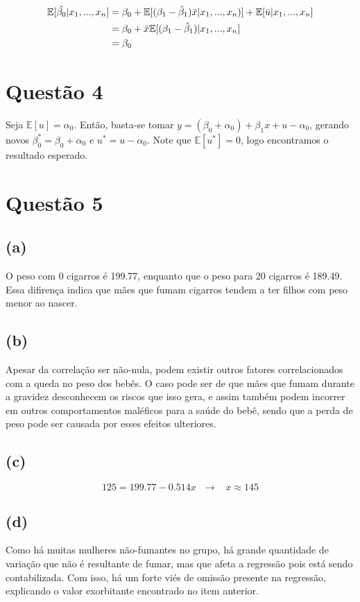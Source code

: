 \documentclass[12pt]{article}
\begin{document}
\begin{align*}
    \mathbb{E}[\hat{\beta_0}|x_1,...,x_n]&=\beta_0+\mathbb{E}[(\beta_1-\hat{\beta}_1)\Bar{x}|x_1,...,x_n)]+\mathbb{E}[\Bar{u}|x_1,...,x_n]\\&
    =\beta_0+\Bar{x}\mathbb{E}[(\beta_1-\hat{\beta}_1)|x_1,...,x_n]\\&=
    \beta_0
\end{align*}

\section*{Questão 4}
Seja $\mathbb{E}[u]=\alpha_0$. Então, basta-se tomar $y=(\beta_0+\alpha_0)+\beta_1x+u-\alpha_0$, gerando novos $\beta_0^*=\beta_0+\alpha_0$ e $u^*=u-\alpha_0$. Note que $\mathbb{E}[u^*]=0$, logo encontramos o resultado esperado.

\section*{Questão 5}

\subsection*{(a)}
O peso com 0 cigarros é 199.77, enquanto que o peso para 20 cigarros é 189.49. Essa difirença indica que mães que fumam cigarros tendem a ter filhos com peso menor ao nascer.

\subsection*{(b)}
Apesar da correlação ser não-nula, podem existir outros fatores correlacionados com a queda no peso dos bebês. O caso pode ser de que mães que fumam durante a gravidez desconhecem os riscos que isso gera, e assim também podem incorrer em outros comportamentos maléficos para a saúde do bebê, sendo que a perda de peso pode ser causada por esses efeitos ulteriores.

\subsection*{(c)}
\begin{equation*}
    125=199.77-0.514x\:\:\:\longrightarrow \;\;\; x \approx 145
\end{equation*}

\subsection*{(d)}
Como há muitas mulheres não-fumantes no grupo, há grande quantidade de variação que não é resultante de fumar, mas que afeta a regressão pois está sendo contabilizada. Com isso, há um forte viés de omissão presente na regressão, explicando o valor exorbitante encontrado no item anterior.
\end{document}

